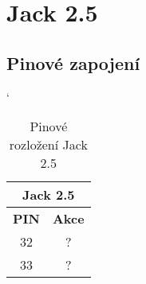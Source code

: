 
\section{Jack 2.5}
\subsection{Pinové zapojení}
\begin{table} [h!]
	\centering
	\catcode`
	\begin{tabular}[c]{|| c | c ||}
	\hline
		\multicolumn{2}{||c||}{Jack 2.5} \\
	\hline
 		 \textbf{PIN} & \textbf{Akce}\\
	\hline
		32 &  ?\\
	\hline
		33 & ? \\
	\hline
	\end{tabular}
	\caption{Pinové rozložení Jack 2.5}
	\label{table:pinJack25}
\end{table}
